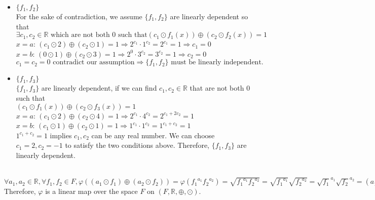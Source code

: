 \documentclass[fleqn, 10.5pt, a4paper]{article}
\newcommand\R{{\mathbb R}}
\theoremstyle{definition}
\numberwithin{equation}{section}
\begin{document}

\begin{itemize}
	\item $\{f_1,f_2\}$ \\
	For the sake of contradiction, we assume $\{f_1,f_2\}$ are linearly dependent so that \\
	$\exists c_1 ,c_2 \in \R \text{ which are not both 0 such that} \left( c_1 \odot f_1(x) \right) \oplus \left( c_2 \odot f_2(x) \right) = 1$ \\
	$x = a$: $\left( c_1 \odot 2 \right) \oplus \left( c_2 \odot 1 \right) = 1 \Rightarrow 2^{c_1} \cdot 1^{c_2} = 2^{c_1} = 1 \Rightarrow c_1 = 0$ \\
	$x = b$: $\left( 0 \odot 1 \right) \oplus \left( c_2 \odot 3 \right) = 1 \Rightarrow 2^{0} \cdot 3^{c_2} = 3^{c_2} = 1 \Rightarrow c_2 = 0$ \\
	$c_1 = c_2 = 0 \text{ contradict our assumption} \Rightarrow \{f_1, f_2\} \text{ must be linearly independent.}$ 	
	\item $\{f_1,f_3\}$ \\
	$\{f_1,f_3\}$ are linearly dependent, if we can find $c_1 ,c_2 \in \R$ that are not both $0$ such that \\
	$\left( c_1 \odot f_1(x) \right) \oplus \left( c_2 \odot f_3(x) \right) = 1$ \\
	$x = a$: $\left( c_1 \odot 2 \right) \oplus \left( c_2 \odot 4 \right) = 1 \Rightarrow 2^{c_1} \cdot 4^{c_2} = 2^{c_1 + 2 c_2} = 1$ \\
	$x = b$: $\left( c_1 \odot 1 \right) \oplus \left( c_2 \odot 1 \right) = 1 \Rightarrow 1^{c_1} \cdot 1^{c_2} = 1^{c_1 + c_2} = 1$ \\
	$1^{c_1 + c_2} = 1$ implies $c_1, c_2$ can be any real number. We can choose $c_1 = 2, c_2 = -1$ to satisfy the two conditions above. Therefore, $\{f_1,f_3\}$ are linearly dependent.
\end{itemize}

 \\

$\forall a_1, a_2 \in \R, \forall f_1, f_2 \in F, \varphi\left((a_1 \odot f_1) \oplus (a_2 \odot f_2) \right) = \varphi({f_1}^{a_1}{f_2}^{a_2}) = \sqrt{{f_1}^{a_1}{f_2}^{a_2}} = \sqrt{{f_1}^{a_1}}\sqrt{{f_2}^{a_2}} = {\sqrt{f_1}}^{a_1}{\sqrt{f_2}}^{a_2} = \left(a_1 \odot \sqrt{f_1}\right)\left(a_2 \odot \sqrt{f_2}\right) = \left(a_1 \odot \varphi(f_1)\right)\left(a_2 \odot \varphi{f_2} \right)= \left(a_1 \odot \varphi(f_1)\right) \oplus \left(a_2 \odot \varphi(f_2)\right)$ \\
Therefore, $\varphi$ is a linear map over the space $F$ on $(F, \mathbb{R}, \oplus, \odot)$.
\end{document}
